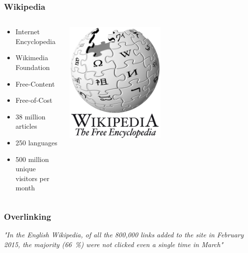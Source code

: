 
\begin{frame}
  \frametitle{Wikipedia}  
\begin{columns}
  \begin{column}{0.5\textwidth}
    \begin{itemize}
      \item Internet Encyclopedia
      \item Wikimedia Foundation
      \item Free-Content
      \item Free-of-Cost
      \item 38 million articles
      \item 250 languages
      \item 500 million unique visitors per month
  \end{itemize}
\end{column}
\begin{column}{0.5\textwidth}  %
    \begin{center}
     \includegraphics[width=0.5\textwidth]{images/Wikipedia-logo-en-big.png}
     \end{center}
\end{column}
\end{columns}

\end{frame}



\begin{frame}
  \frametitle{Overlinking}
  
  \centering \textit{"In the English Wikipedia, of all the 800,000 links added to the site in February 2015, the majority (66~\%) were not clicked even a single time in March"}
  
  
\end{frame}

